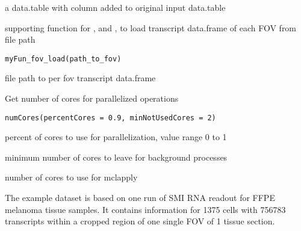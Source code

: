 \documentclass[letterpaper]{book}
\begin{document}
%
\begin{Value}
a data.table with  column added to original input data.table
\end{Value}
%
\begin{Description}
supporting function for ,  and , to load transcript data.frame of each FOV from file path
\end{Description}
%
\begin{Usage}
\begin{verbatim}
myFun_fov_load(path_to_fov)
\end{verbatim}
\end{Usage}
%
\begin{Arguments}
\begin{ldescription}
\item[\code{path\_to\_fov}] file path to per fov transcript data.frame
\end{ldescription}
\end{Arguments}
%
\begin{Description}
Get number of cores for parallelized operations
\end{Description}
%
\begin{Usage}
\begin{verbatim}
numCores(percentCores = 0.9, minNotUsedCores = 2)
\end{verbatim}
\end{Usage}
%
\begin{Arguments}
\begin{ldescription}
\item[\code{percentCores}] percent of cores to use for parallelization, value range 0 to 1

\item[\code{minNotUsedCores}] minimum number of cores to leave for background processes
\end{ldescription}
\end{Arguments}
%
\begin{Value}
number of cores to use for mclapply
\end{Value}
%
\begin{Description}
The example dataset is based on one run of SMI RNA readout for FFPE melanoma tissue samples. It contains information for 1375 cells with 756783 transcripts within a cropped region of one single FOV of 1 tissue section.
\end{Description}
\end{document}
